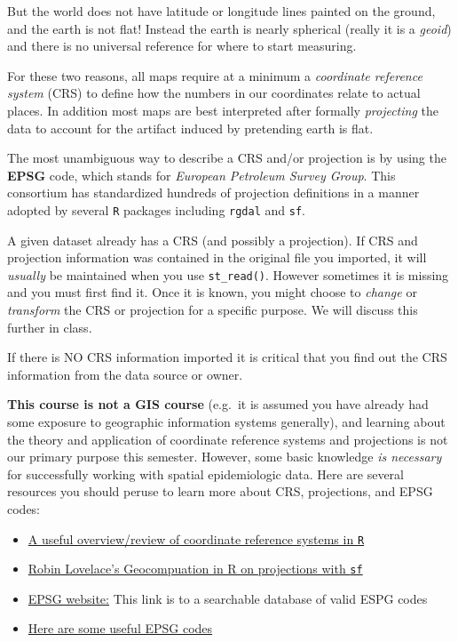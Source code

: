 \documentclass[
]{book}
\providecommand{\tightlist}{%
  \setlength{\itemsep}{0pt}\setlength{\parskip}{0pt}}
\newenvironment{rmdcaution}[1]
  {
  \begin{itemize}
  \renewcommand{\labelitemi}{
    \raisebox{-.7\height}[0pt][0pt]{
      {\setkeys{Gin}{width=3em,keepaspectratio}\texttt{[image: images/\#1]}}
    }
  }
  \setlength{\fboxsep}{1em}
  \begin{caution}
  \item
  }
  {
  \end{caution}
  \end{itemize}
  }
\begin{document}
But the world does not have latitude or longitude lines painted on the ground, and the earth is not flat! Instead the earth is nearly spherical (really it is a \emph{geoid}) and there is no universal reference for where to start measuring.

For these two reasons, all maps require at a minimum a \emph{coordinate reference system} (CRS) to define how the numbers in our coordinates relate to actual places. In addition most maps are best interpreted after formally \emph{projecting} the data to account for the artifact induced by pretending earth is flat.

The most unambiguous way to describe a CRS and/or projection is by using the \textbf{EPSG} code, which stands for \emph{European Petroleum Survey Group}. This consortium has standardized hundreds of projection definitions in a manner adopted by several \texttt{R} packages including \texttt{rgdal} and \texttt{sf}.

A given dataset already has a CRS (and possibly a projection). If CRS and projection information was contained in the original file you imported, it will \emph{usually} be maintained when you use \texttt{st\_read()}. However sometimes it is missing and you must first find it. Once it is known, you might choose to \emph{change} or \emph{transform} the CRS or projection for a specific purpose. We will discuss this further in class.

\begin{rmdcaution}{caution}
If there is NO CRS information imported it is critical that you find out the CRS information from the data source or owner.

\end{rmdcaution}

\textbf{This course is not a GIS course} (e.g.~it is assumed you have already had some exposure to geographic information systems generally), and learning about the theory and application of coordinate reference systems and projections is not our primary purpose this semester. However, some basic knowledge \emph{is necessary} for successfully working with spatial epidemiologic data. Here are several resources you should peruse to learn more about CRS, projections, and EPSG codes:

\begin{itemize}
\tightlist
\item
  \href{https://www.nceas.ucsb.edu/sites/default/files/2020-04/OverviewCoordinateReferenceSystems.pdf}{A useful overview/review of coordinate reference systems in \texttt{R}}
\item
  \href{https://geocompr.robinlovelace.net/reproj-geo-data.html}{Robin Lovelace's Geocompuation in R on projections with \texttt{sf}}
\item
  \href{https://epsg.io/}{EPSG website:} This link is to a searchable database of valid ESPG codes
\item
  \href{https://guides.library.duke.edu/r-geospatial/CRS}{Here are some useful EPSG codes}
\end{itemize}
\end{document}
